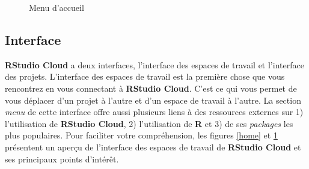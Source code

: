 \documentclass[10.5pt,a4paper]{article}
\begin{document}
\begin{figure}[H]
  \centering
  \caption{Menu d'accueil}
  \label{homeMenu}
\end{figure}

\subsection{Interface}
  \textbf{RStudio Cloud} a deux interfaces, l'interface des espaces de travail et l'interface des projets. L'interface des espaces de travail est la première chose que vous rencontrez en vous connectant à \textbf{RStudio Cloud}. C'est ce qui vous permet de vous déplacer d'un projet à l'autre et d'un espace de travail à l'autre. La section \emph{menu} de cette interface offre aussi plusieurs liens à des ressources externes sur 1) l'utilisation de \textbf{RStudio Cloud}, 2) l'utilisation de \textbf{R} et 3) de ses \emph{packages} les plus populaires. Pour faciliter votre compréhension, les figures \ref{home} et \ref{homeMenu} présentent un aperçu de l'interface des espaces de travail de \textbf{RStudio Cloud} et ses principaux points d'intérêt.
\end{document}
